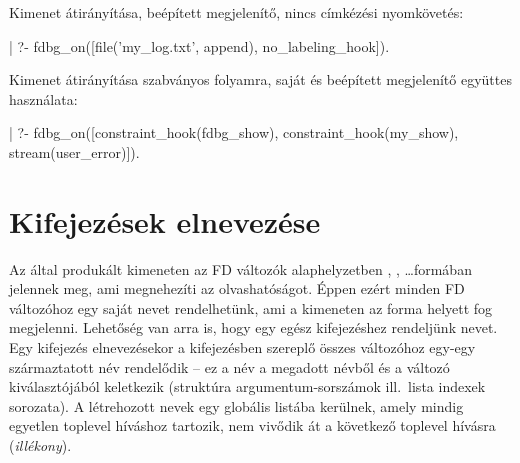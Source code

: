 Kimenet átirányítása, beépített megjelenítő, nincs címkézési nyomkövetés:

\begin{prologcode}
| ?- fdbg_on([file('my_log.txt', append), no_labeling_hook]).
\end{prologcode}

Kimenet átirányítása szabványos folyamra, saját és beépített
megjelenítő együttes használata:

\begin{prologcode}
| ?- fdbg_on([constraint_hook(fdbg_show), constraint_hook(my_show),
              stream(user_error)]).
\end{prologcode}

\section{Kifejezések elnevezése}

Az \fdbg által produkált kimeneten az FD változók alaphelyzetben ,
, \ldots formában jelennek meg, ami megnehezíti az olvashatóságot.
Éppen ezért minden FD változóhoz egy saját nevet rendelhetünk, ami a kimeneten
az  forma helyett fog megjelenni. Lehetőség van arra is,
hogy egy egész kifejezéshez rendeljünk nevet. Egy kifejezés elnevezésekor a
kifejezésben szereplő összes változóhoz egy-egy származtatott név
rendelődik -- ez a név a megadott névből és a változó kiválasztójából
keletkezik (struktúra argumentum-sorszámok ill.\ lista indexek sorozata). A
létrehozott nevek egy globális listába kerülnek, amely mindig egyetlen toplevel
híváshoz tartozik, nem vivődik át a következő toplevel hívásra (\emph{illékony}).



